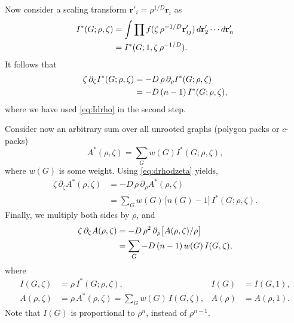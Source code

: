 \documentclass[preprint]{revtex4-1}
\newcommand{\vct}[1]{\mathbf{#1}}
\providecommand{\vr}{} %
\renewcommand{\vr}{\vct{r}}
\begin{document}
Now consider a scaling transform
$\vr'_i = \rho^{1/D} \vr_i$
as
\begin{align*}
  I^*(G; \rho, \zeta)
&= \int \prod f(\zeta \, \rho^{-1/D} \vr'_{ij})
        \, d\vr'_2 \cdots d\vr'_n
  \notag \\
&= I^*(G; 1, \zeta \, \rho^{-1/D}).
\end{align*}
%
It follows that
\begin{align}
 \zeta \, \partial_\zeta I^*(G; \rho, \zeta)
&= -D \, \rho \, \partial_\rho I^*(G; \rho, \zeta) \notag \\
&= -D \, (n - 1) \, I^*(G; \rho, \zeta),
\label{eq:drhodzeta}
\end{align}
where we have used \eqref{eq:Idrho} in the second step.


Consider now an arbitrary sum over all unrooted graphs (polygon packs or $c$-packs)
\[
  A^*(\rho, \zeta) = \sum_G w(G) I^*(G; \rho, \zeta),
\]
where $w(G)$ is some weight.
%
Using \eqref{eq:drhodzeta} yields,
\begin{align*}
  \zeta \, \partial_\zeta A^*(\rho, \zeta)
&=
  -D \, \rho \, \partial_\rho A^*(\rho, \zeta)
  \\
&=
  \sum_G w(G) \, \bigl[ n(G) - 1 \bigr] \, I^*(G; \rho, \zeta).
\end{align*}
%
Finally, we multiply both sides by $\rho$, and
%
\begin{align}
  \zeta \, \partial_\zeta A(\rho, \zeta) %
  &= -D \, \rho^2 \, \partial_\rho \big[ A(\rho, \zeta)/\rho \big] \notag \\
  &= \sum_G -D \, (n - 1) \, w(G) \, I(G, \zeta),
  \label{eq:virialtheorem}
\end{align}
where
\begin{align*}
  I(G, \zeta)    &= \rho \, I^*(G; \rho, \zeta), &
            I(G) &= I(G, 1), \\
  A(\rho, \zeta) &= \rho \, A^*(\rho, \zeta) = \sum_G w(G) \, I(G, \zeta), &
         A(\rho) &= A(\rho, 1).
\end{align*}
%
Note that
$I(G)$ is
proportional to $\rho^n$, instead of $\rho^{n-1}$.
\end{document}
